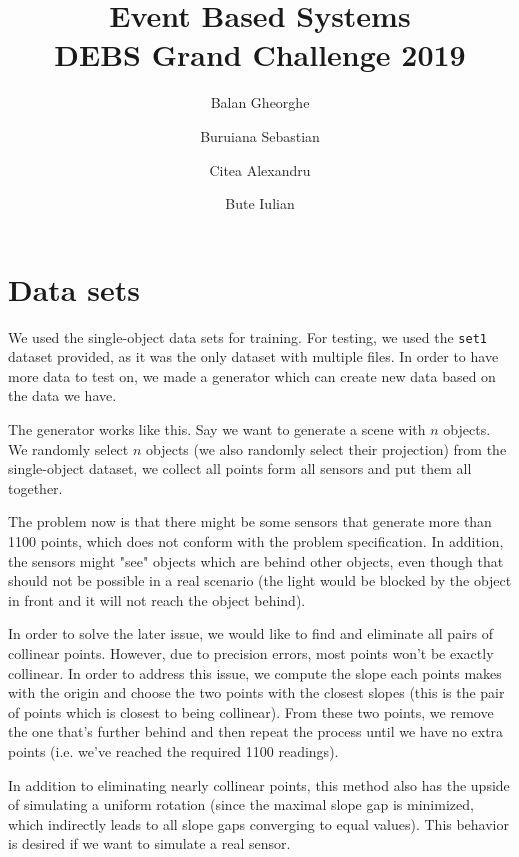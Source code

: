 \documentclass{article}
\begin{document}
		
	\title{
		Event Based Systems \\
		DEBS Grand Challenge 2019}
	\date{}
	\author{Balan Gheorghe
		\and Buruiana Sebastian
		\and Citea Alexandru
		\and Bute Iulian
	}
	
	
	\maketitle
	
	\tableofcontents{}
	
	\pagebreak
	
	\section{Data sets}
	
	We used the single-object data sets for training. For testing, we used the \texttt{set1} dataset provided, as it was the only dataset with multiple files. In order to have more data to test on, we made a generator which can create new data based on the data we have.
	
	The generator works like this. Say we want to generate a scene with $n$ objects. We randomly select $n$ objects (we also randomly select their projection) from the single-object dataset, we collect all points form all sensors and put them all together.
	
	The problem now is that there might be some sensors that generate more than 1100 points, which does not conform with the problem specification. In addition, the sensors might "see" objects which are behind other objects, even though that should not be possible in a real scenario (the light would be blocked by the object in front and it will not reach the object behind).
	
	In order to solve the later issue, we would like to find and eliminate all pairs of collinear points. However, due to precision errors, most points won't be exactly collinear. In order to address this issue, we compute the slope each points makes with the origin and choose the two points with the closest slopes (this is the pair of points which is closest to being collinear). From these two points, we remove the one that's further behind and then repeat the process until we have no extra points (i.e. we've reached the required 1100 readings).
	
	In addition to eliminating nearly collinear points, this method also has the upside of simulating a uniform rotation (since the maximal slope gap is minimized, which indirectly leads to all slope gaps converging to equal values). This behavior is desired if we want to simulate a real sensor.
	
\end{document}
